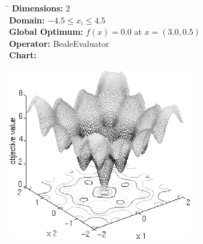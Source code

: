\documentclass[12pt, a4paper]{article}
\begin{document}
		\begin{tabbing}
			\hspace{5cm}\=\kill
			\textbf{Dimensions:}     \> $2$ \\
			\textbf{Domain:}         \> $-4.5 \leq x_i \leq 4.5$ \\
			\textbf{Global Optimum:} \> $f(x) = 0.0$ at $x = (3.0, 0.5)$ \\
			\textbf{Operator:}       \> BealeEvaluator \\
			\textbf{Chart:}          \> \\
		\end{tabbing}

		\begin{center}
			\includegraphics[width=0.6\textwidth]{Images/Ackley}
		\end{center}
\end{document}
